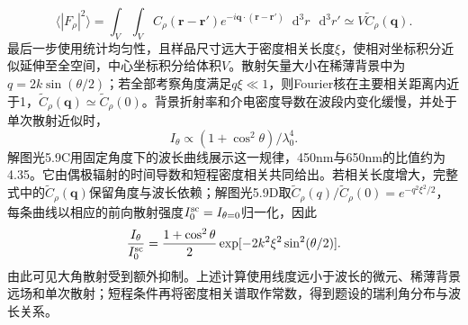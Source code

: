 \documentclass[UTF8,fontset=fandol,a4paper,11pt]{ctexart}
\newcommand{\dd}{\mathop{}\!\mathrm{d}}
\begin{document}
\[
\langle|F_\rho|^2\rangle
=\int_V\!\int_V C_\rho(\boldsymbol r-\boldsymbol r')
e^{-i\boldsymbol q\cdot(\boldsymbol r-\boldsymbol r')}\dd^3r\,\dd^3r'
\simeq V\widetilde C_\rho(\boldsymbol q).
\]
最后一步使用统计均匀性，且样品尺寸远大于密度相关长度$\xi$，使相对坐标积分近似延伸至全空间，中心坐标积分给体积$V$。散射矢量大小在稀薄背景中为$q=2k\sin(\theta/2)$；若全部考察角度满足$q\xi\ll1$，则Fourier核在主要相关距离内近于1，$\widetilde C_\rho(\boldsymbol q)\simeq\widetilde C_\rho(0)$。背景折射率和介电密度导数在波段内变化缓慢，并处于单次散射近似时，
\[
\boxed{I_\theta\propto(1+\cos^2\theta)/\lambda_0^4}.
\]
解图光5.9C用固定角度下的波长曲线展示这一规律，450nm与650nm的比值约为4.35。它由偶极辐射的时间导数和短程密度相关共同给出。若相关长度增大，完整式中的$\widetilde C_\rho(\boldsymbol q)$保留角度与波长依赖；解图光5.9D取$\widetilde C_\rho(q)/\widetilde C_\rho(0)=e^{-q^2\xi^2/2}$，每条曲线以相应的前向散射强度$I_0^{\rm sc}=I_{\theta=0}$归一化，因此
\[
 \frac{I_\theta}{I_0^{\rm sc}}=\frac{1+\cos^2\theta}{2}\exp[-2k^2\xi^2\sin^2(\theta/2)].
\]
由此可见大角散射受到额外抑制。上述计算使用线度远小于波长的微元、稀薄背景远场和单次散射；短程条件再将密度相关谱取作常数，得到题设的瑞利角分布与波长关系。
\end{document}

